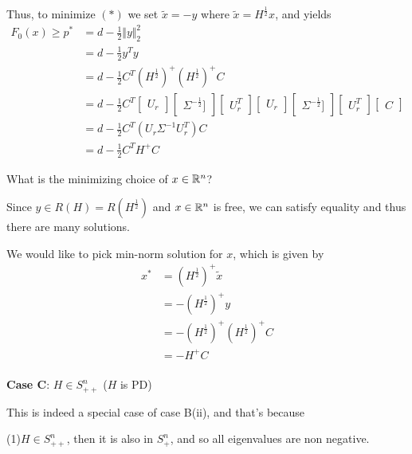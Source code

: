 Thus, to minimize $(*)$ we set $\tilde{x} = -y$ where $\tilde{x} = H^{\frac{1}{2}}x$, and yields
\begin{align*}
F_0(x) \geq p^* &= d - \frac{1}{2}\Vert y \Vert_2^2\\
&= d - \frac{1}{2}y^Ty\\
&= d - \frac{1}{2}C^T(H^{\frac{1}{2}})^+(H^{\frac{1}{2}})^+C\\
&= d - \frac{1}{2}C^T
\begin{bmatrix}
U_r
\end{bmatrix}
\begin{bmatrix}
\Sigma^{-\frac{1}{2}}]
\end{bmatrix}
\begin{bmatrix}
U_r^T
\end{bmatrix}
\begin{bmatrix}
U_r
\end{bmatrix}
\begin{bmatrix}
\Sigma^{-\frac{1}{2}}]
\end{bmatrix}
\begin{bmatrix}
U_r^T
\end{bmatrix}
\begin{bmatrix}
C
\end{bmatrix}\\
&= d - \frac{1}{2}C^T(U_r\Sigma^{-1}U^T_r)C\\
&= d - \frac{1}{2}C^TH^+C
\end{align*}

What is the minimizing choice of $x\in \mathbb{R}^n$?

Since $y\in R(H) = R(H^{\frac{1}{2}})$ and $x\in \mathbb{R}^n$ is free, we can satisfy equality and thus there are many solutions. 

We would like to pick min-norm solution for $x$, which is given by
\begin{align*}
x^* 
&= (H^{\frac{1}{2}})^+\tilde{x}\\
&= -(H^{\frac{1}{2}})^+y\\
&= -(H^{\frac{1}{2}})^+(H^{\frac{1}{2}})^+C\\
&= -H^+C
\end{align*}\\

\vspace{0.3cm}
\textbf{Case C}: $H\in S^n_{++}$ ($H$ is PD)

This is indeed a special case of case B(ii), and that's because

(1)$H\in S^n_{++}$, then it is also in $S^n_{+}$, and so all eigenvalues are non negative.

